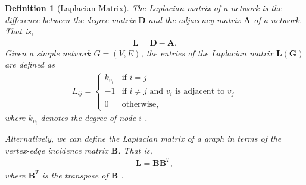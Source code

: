 \documentclass[10pt,a4paper]{article}
\newtheorem{defn}{Definition}
\begin{document}
\begin{defn}[Laplacian Matrix]
	The Laplacian matrix of a network is the difference between the degree matrix $\mathbf{D}$ and the adjacency matrix $\mathbf{A}$ of a network. That is,
	\begin{eqnarray}
	\mathbf{L} = \mathbf{D} - \mathbf{A}.
	\end{eqnarray}
	Given a simple network $G=(V,E)$, the entries of the Laplacian matrix $\mathbf{L(G)}$  are defined as
	\begin{eqnarray}
	L_{ij} = \begin{cases} k_{v_i} &\mbox{if } i = j \\
	-1 &\mbox{if } i \neq j \text{ and } v_i \text{ is adjacent to } v_j \\
	0 & \text{otherwise},
	\end{cases}
	\end{eqnarray}
	where $k_{v_i}$  denotes the degree of node $i$ \citep{estrada2011structure}.
	
	Alternatively, we can define the Laplacian matrix of a graph in terms of the vertex-edge incidence matrix $\mathbf{B}$. That is,
	\begin{eqnarray}
	\mathbf{L} =  \mathbf{B} \mathbf{B}^T,
	\label{lintermsb}
	\end{eqnarray}
	where $\mathbf{B}^T$ is the transpose of $\mathbf{B}$ \citep{estrada2011structure}.
\end{defn}

\end{document}
